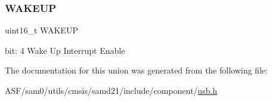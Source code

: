 \subsubsection{\texorpdfstring{WAKEUP}{WAKEUP}}
{\footnotesize\ttfamily uint16\+\_\+t W\+A\+K\+E\+UP}

bit\+: 4 Wake Up Interrupt Enable 

The documentation for this union was generated from the following file\+:\begin{DoxyCompactItemize}
\item 
A\+S\+F/sam0/utils/cmsis/samd21/include/component/\mbox{\hyperlink{component_2usb_8h}{usb.\+h}}\end{DoxyCompactItemize}
